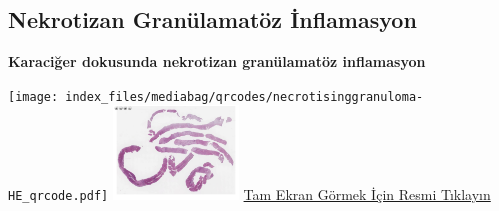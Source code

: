 \documentclass[
  letterpaper,
  DIV=11,
  numbers=noendperiod]{scrreprt}
\begin{document}
\subsection{Nekrotizan Granülamatöz
İnflamasyon}\label{sec-nekrotizan-granulamatoz-inflamasyon}

\textbf{Karaciğer dokusunda nekrotizan granülamatöz inflamasyon}

\texttt{[image: index\_files/mediabag/qrcodes/necrotisinggranuloma-HE\_qrcode.pdf]}
\href{https://images.patolojiatlasi.com/necrotisinggranuloma/HE.html}{\includegraphics[width=0.25\textwidth,height=\textheight]{./screenshots/thumbnail_necrotisinggranuloma.png}}
\href{https://images.patolojiatlasi.com/necrotisinggranuloma/HE.html}{Tam
Ekran Görmek İçin Resmi Tıklayın}
\end{document}
